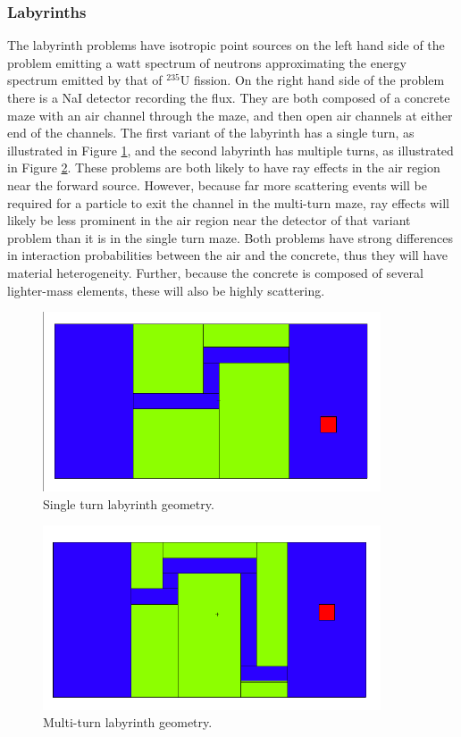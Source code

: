 \subsubsection*{Labyrinths}

The labyrinth problems have isotropic point sources on the left hand side of the
problem emitting a watt spectrum of
neutrons approximating the energy spectrum emitted by that of $^{235}$U fission.
On the right hand side of the problem there is a NaI detector recording the flux.
They are both composed of a concrete maze with an air channel through the maze, and
then open air channels at either end of the channels. The first variant of the
labyrinth has a single turn, as illustrated in Figure \ref{fig:maze2geom}, and
the second labyrinth has multiple turns, as illustrated in Figure
\ref{fig:maze1geom}. These problems are both
likely to have ray effects in the air region near the forward source. However,
because far more scattering events will be required for a particle to exit the
channel in the multi-turn maze, ray effects will likely be less prominent in the
air region near the detector of that variant problem than it is in the single
turn maze. Both problems have strong
differences in interaction probabilities between the air and the concrete,
thus they will have material heterogeneity. Further, because the concrete is
composed of several lighter-mass elements, these will also be highly scattering.

\begin{figure}[h!]
  \centering
  \includegraphics[width=10cm]{./chapters/characterization_probs/figures/geometries/maze2.png}
  \caption[Single turn labyrinth geometry.]{Single turn labyrinth geometry.}
  \label{fig:maze2geom}
\end{figure}

\begin{figure}[h!]
  \centering
  \includegraphics[width=10cm]{./chapters/characterization_probs/figures/geometries/maze1.png}
  \caption[Multi-turn labyrinth geometry.]{Multi-turn labyrinth geometry.}
  \label{fig:maze1geom}
\end{figure}


